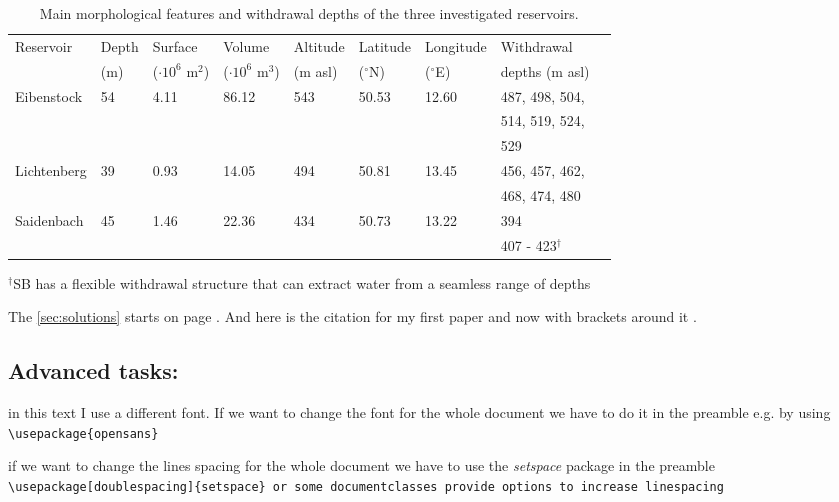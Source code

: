 \documentclass{article}
\numberwithin{equation}{section}
\begin{document}
	\begin{table}[h!]
	\centering
	\caption{Main morphological features and withdrawal depths of the three investigated reservoirs.}
	\label{tab:reservoirs}
	\tiny
	\begin{tabular}{lllllllll}\hline
		Reservoir    & Depth & Surface   & Volume     & Altitude & Latitude    &
		Longitude  & Withdrawal \\
		&   	 (m)	 &	 ($\cdot 10^6$ m$^2$)     & ($\cdot10^6$ m$^3$)    &  (m asl)   &
		($^\circ$N) & ($^\circ$E) & depths (m asl)\\ \hline
		Eibenstock   &  54          & 4.11        & 86.12  & 543          & 50.53     & 12.60    & 487, 498, 504,  \\
		&&&&&&& 514, 519, 524,\\
		&&&&&&&  529\\
		Lichtenberg  &  39          & 0.93        & 14.05  &  494         & 50.81     & 13.45    & 456, 457, 462, \\
		&&&&&&& 468, 474, 480\\
		Saidenbach   &  45          & 1.46        & 22.36  &  434          & 50.73     & 13.22    & 394 \\
		&&&&&&& 407 - 423$^\dagger$\\ \hline
	\end{tabular}

	\raggedright

	{\tiny $^\dagger$SB has a flexible withdrawal structure that can extract water from a
		seamless range of depths}
\end{table}


The \autoref{sec:solutions} starts on page \pageref{sec:solutions}. And here is the citation for my first paper \citet{feldbauer_managing_2020} and now with brackets around it \citep{feldbauer_managing_2020}.


\subsection{Advanced tasks:}

{\selectfont
	in this text I use a different font. If we want to change the font for the whole document we have to do it in the preamble e.g. by using \texttt{\textbackslash usepackage\{opensans\}}
}


if we want to change the lines spacing for the whole document we have to use the \textit{setspace} package in the preamble \texttt{\textbackslash usepackage[doublespacing]\{setspace\} or some documentclasses provide options to increase linespacing}
\end{document}
